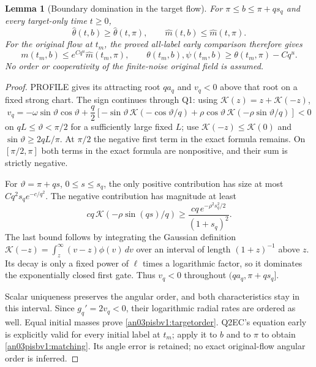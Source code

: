 \documentclass[11pt]{article}
\numberwithin{equation}{section}
\newtheorem{lemma}[theorem]{Lemma}
\theoremstyle{remark}\newtheorem{remark}[theorem]{Remark}
\newcommand{\dd}{\,d}
\newcommand{\Kh}{\mathcal K}
\begin{document}
\begin{lemma}[Boundary domination in the target flow]
\label{an03pisbv1:domination}
For $\pi\le b\le\pi+qs_q$ and every target-only time $t\ge0$,
\begin{equation}
 \widehat\theta(t,b)\ge\widehat\theta(t,\pi),\qquad
 \widehat m(t,b)\le\widehat m(t,\pi).
 \label{an03pisbv1:targetorder}
\end{equation}
For the original flow at $t_m$, the proved all-label early comparison
therefore gives
\begin{equation}
 m(t_m,b)\le e^{Cq^u}\widehat m(t_m,\pi),\qquad
 \theta(t_m,b),\psi(t_m,b)
       \ge\theta(t_m,\pi)-Cq^u .
 \label{an03pisbv1:matching}
\end{equation}
No order or cooperativity of the finite-noise original field is
assumed.
\end{lemma}
\begin{proof}
PROFILE gives its attracting root $qa_q$ and $v_q<0$ above that
root on a fixed strong chart. The sign continues through Q1:
using $\Kh(z)=z+\Kh(-z)$,
\[
 v_q=-\omega\sin\vartheta\cos\vartheta
 +\frac q2[-\sin\vartheta\,\Kh(-\cos\vartheta/q)
          +\rho\cos\vartheta\,\Kh(-\rho\sin\vartheta/q)]<0
\]
on $qL\le\vartheta<\pi/2$ for a sufficiently large fixed $L$;
use $\Kh(-z)\le\Kh(0)$ and $\sin\vartheta\ge2qL/\pi$.
At $\pi/2$ the negative first term in the exact formula remains.
On $[\pi/2,\pi]$ both terms in the exact formula are nonpositive,
and their sum is strictly negative.

For $\vartheta=\pi+qs$, $0\le s\le s_q$, the only positive
contribution has size at most $Cq^2s_q e^{-c/q^2}$.
The negative contribution has magnitude at least
\[
 cq\,\Kh(-\rho\sin(qs)/q)
       \ge \frac{cq\,e^{-\rho^2s_q^2/2}}{(1+s_q)^2}.
\]
The last bound follows by integrating the Gaussian definition
$\Kh(-z)=\int_z^\infty(v-z)\phi(v)\dd v$
over an interval of length $(1+z)^{-1}$ above $z$.
Its decay is only a fixed power of $\ell$ times a logarithmic
factor, so it dominates the exponentially closed first gate.
Thus $v_q<0$ throughout $(qa_q,\pi+qs_q]$.

Scalar uniqueness preserves the angular order, and both
characteristics stay in this interval. Since $g_q'=2v_q<0$,
their logarithmic radial rates are ordered as well. Equal initial
masses prove \eqref{an03pisbv1:targetorder}.
Q2EC's equation early is explicitly valid for every initial label
at $t_m$; apply it to $b$ and to $\pi$ to obtain
\eqref{an03pisbv1:matching}. Its angle error is retained; no exact
original-flow angular order is inferred.
\end{proof}
\end{document}
